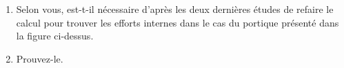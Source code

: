 \documentclass[lecture.tex]{subfiles}
\begin{document}
\begin{enumerate}
  \medskip

  \item Selon vous, est-t-il nécessaire d’après les deux dernières études de refaire le calcul pour trouver les efforts internes dans le cas du portique présenté dans la figure ci-dessus.
  \item Prouvez-le.
\end{enumerate}


\finexercice
\end{document}
